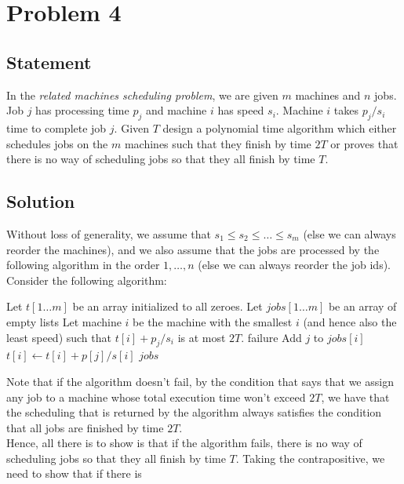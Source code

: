 \documentclass[a4paper]{article}
\newcommand{\nl}{\vspace{0.2cm}\\}
\begin{document}
\newpage

\section{Problem 4}
\subsection{Statement}
In the \emph{related machines scheduling problem}, we are given $m$ machines and $n$ jobs. Job $j$ has processing time $p_j$ and machine $i$ has speed $s_i$.  Machine $i$ takes $p_j/s_i$ time to
complete job $j$. Given $T$ design a polynomial time algorithm which either schedules jobs on the $m$ machines such that they finish by time $2T$ or proves that there is no way of scheduling jobs so
that they all finish by time $T$.
\subsection{Solution}
Without loss of generality, we assume that $s_1 \le s_2 \le \ldots \le s_m$ (else we can always reorder the machines), and we also assume that the jobs are processed by the following algorithm in the order $1, \ldots, n$ (else we can always reorder the job ids).
Consider the following algorithm:
\begin{algorithmic}[1]
        \State Let $t[1 \ldots m]$ be an array initialized to all zeroes.
        \State Let $jobs[1 \ldots m]$ be an array of empty lists
            \State Let machine $i$ be the machine with the smallest $i$ (and hence also the least speed) such that $t[i] + p_j / s_i$ is at most $2T$.
                \State \Return failure
            \EndIf
            \State Add $j$ to $jobs[i]$
            \State $t[i] \gets t[i] + p[j] / s[i]$
        \EndFor
        \State \Return $jobs$
    \EndFunction
\end{algorithmic}
Note that if the algorithm doesn't fail, by the condition that says that we assign any job to a machine whose total execution time won't exceed $2T$, we have that the scheduling that is
returned by the algorithm always satisfies the condition that all jobs are finished by time $2T$.\nl
Hence, all there is to show is that if the algorithm fails, there is no way of scheduling jobs so that they all finish by time $T$. Taking the contrapositive, we need to show that if there is
\end{document}
